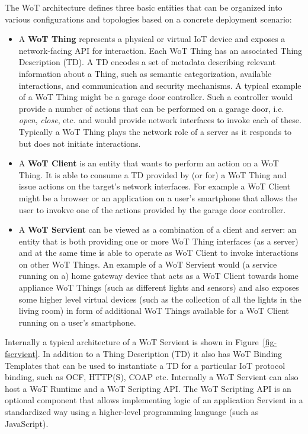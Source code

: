 The WoT architecture\cite{Wot2017arch} defines three basic entities
that can be organized into various configurations and topologies 
based on a concrete deployment scenario:

\begin{itemize}
	\item A \textbf{WoT Thing} represents a physical or virtual IoT device 
        and exposes a network-facing API for interaction.
	Each WoT Thing has an associated Thing Description (TD)\cite{Wot2017td}. 
        A TD encodes a set of metadata describing relevant information about a Thing,
        such as semantic categorization, available interactions, and communication and security mechanisms.
	A typical example of a WoT Thing might be a garage door controller.
        Such a controller would provide a number of actions that can be performed on a garage door, 
        i.e. \textit{open}, \textit{close}, etc. and would provide network interfaces to invoke
        each of these.
        Typically a WoT Thing plays the network role of a server as it responds to
        but does not initiate interactions.
	\item A \textbf{WoT Client} is an entity that wants to perform an action on a WoT Thing.
	It is able to consume a TD provided by (or for) a WoT Thing and issue actions on 
        the target's network interfaces.
	For example a WoT Client might be a browser or an application on a user's smartphone
        that allows the user to invokve one of the actions provided by the garage door controller. 
	\item A \textbf{WoT Servient} can be viewed as a combination of a client and server:
        an entity that is both providing one or more WoT Thing interfaces (as a server) and
        at the same time is able to operate as WoT Client to invoke interactions on other WoT Things.
	An example of a WoT Servient would (a service running on a) home gateway device 
        that acts as a WoT Client towards home appliance WoT Things
        (such as different lights and sensors) and also exposes some higher level
        virtual devices (such as the collection of all the lights in the living room)
        in form of additional WoT Things available for a WoT Client running on a user's smartphone.
\end{itemize}

Internally a typical architecture of a WoT Servient is shown in Figure~\ref{fig-fservient}. 
In addition to a Thing Description (TD) it also has WoT Binding Templates 
that can be used to instantiate a TD for a particular IoT protocol binding, 
such as OCF, HTTP(S), COAP etc. 
Internally a WoT Servient can also host a WoT Runtime and
a WoT Scripting API.
The WoT Scripting API is an optional component that allows 
implementing logic of an application Servient in a standardized way
using a higher-level programming language (such as JavaScript). 


